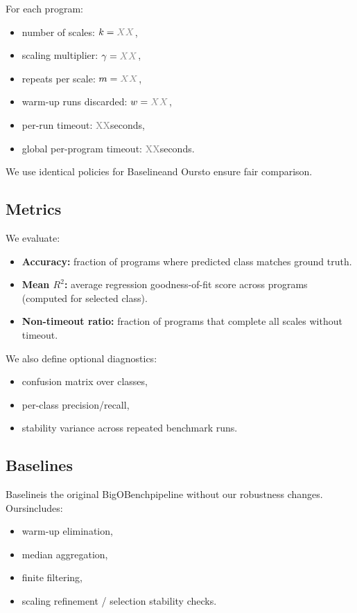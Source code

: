 \documentclass[conference]{IEEEtran}
\newcommand{\toolname}{BigOBench}
\newcommand{\ours}{Ours}
\newcommand{\baseline}{Baseline}
\newcommand{\placeholder}{\textcolor{gray}{XX}}
\begin{document}
For each program:
\begin{itemize}[leftmargin=1.2em]
\item number of scales: $k = \placeholder$,
\item scaling multiplier: $\gamma = \placeholder$,
\item repeats per scale: $m = \placeholder$,
\item warm-up runs discarded: $w = \placeholder$,
\item per-run timeout: \placeholder seconds,
\item global per-program timeout: \placeholder seconds.
\end{itemize}

We use identical policies for \baseline and \ours to ensure fair comparison.

\subsection{Metrics}

We evaluate:
\begin{itemize}[leftmargin=1.2em]
\item \textbf{Accuracy:} fraction of programs where predicted class matches
ground truth.
\item \textbf{Mean $R^2$:} average regression goodness-of-fit score across
programs (computed for selected class).
\item \textbf{Non-timeout ratio:} fraction of programs that complete all scales
without timeout.
\end{itemize}

We also define optional diagnostics:
\begin{itemize}[leftmargin=1.2em]
\item confusion matrix over classes,
\item per-class precision/recall,
\item stability variance across repeated benchmark runs.
\end{itemize}

\subsection{Baselines}

\baseline is the original \toolname pipeline without our robustness changes.
\ours includes:
\begin{itemize}[leftmargin=1.2em]
\item warm-up elimination,
\item median aggregation,
\item finite filtering,
\item scaling refinement / selection stability checks.
\end{itemize}
\end{document}
